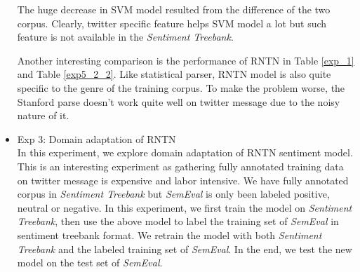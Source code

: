 \begin{itemize}
The huge decrease in SVM model resulted from the difference of the two corpus. 
Clearly, twitter specific feature helps SVM model a lot but such feature is not available in the \textit{Sentiment Treebank}. 

Another interesting comparison is the performance of RNTN in Table \ref{exp_1} and Table \ref{exp5_2_2}. Like statistical parser, RNTN model is also quite specific to the genre of the training corpus. To make the problem worse, the Stanford parse doesn't work quite well on twitter message due to the noisy nature of it. 

\item Exp 3: Domain adaptation of RNTN\\
In this experiment, we explore domain adaptation of RNTN sentiment model. This is an interesting experiment as gathering fully annotated training data on twitter message is expensive and labor intensive. We have fully annotated corpus in \textit{Sentiment Treebank} but \textit{SemEval} is only been labeled positive, neutral or negative. In this experiment, we first train the model on \textit{Sentiment Treebank}, then use the above model to label the training set of \textit{SemEval} in sentiment treebank format. We retrain the model with both \textit{Sentiment Treebank} and the labeled  training set of \textit{SemEval}. In the end, we test the new model on the test set of \textit{SemEval}.






\end{itemize}
